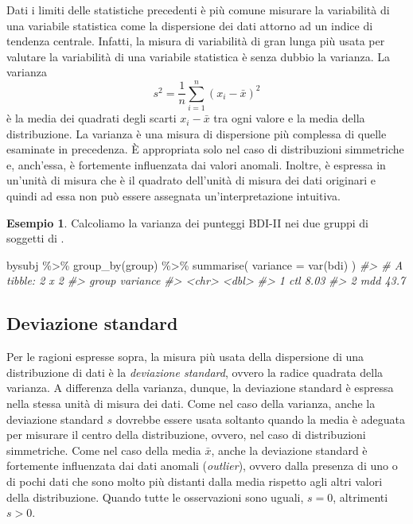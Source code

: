 \documentclass[
  11pt,
  italian,
  a4paper,
  extrafontsizes,onecolumn,openright
  ]{memoir}
\newenvironment{Shaded}{\begin{snugshade}}{\end{snugshade}}
\newcommand{\AttributeTok}[1]{\textcolor[rgb]{0.77,0.63,0.00}{#1}}
\newcommand{\CommentTok}[1]{\textcolor[rgb]{0.56,0.35,0.01}{\textit{#1}}}
\newcommand{\FunctionTok}[1]{\textcolor[rgb]{0.00,0.00,0.00}{#1}}
\newcommand{\NormalTok}[1]{#1}
\newcommand{\SpecialCharTok}[1]{\textcolor[rgb]{0.00,0.00,0.00}{#1}}
\theoremstyle{definition}
\theoremstyle{definition}
\newtheorem{example}{Esempio}[chapter]
\theoremstyle{definition}
\theoremstyle{definition}
\theoremstyle{remark}
\begin{document}
Dati i limiti delle statistiche precedenti è più comune misurare la
variabilità di una variabile statistica come la dispersione dei dati
attorno ad un indice di tendenza centrale. Infatti, la misura di variabilità di gran lunga più usata per valutare la variabilità di una variabile statistica è senza dubbio la varianza. La varianza
\begin{equation}
s^2 = \frac{1}{n} \sum_{i=1}^n (x_i - \bar{x})^2
\label{eq:var-descr}
\end{equation}
è la media dei quadrati degli scarti \(x_i - \bar{x}\) tra ogni valore e la media della distribuzione.
La varianza è una misura di dispersione più complessa di quelle esaminate in precedenza. È appropriata solo nel caso di distribuzioni simmetriche e, anch'essa, è fortemente influenzata dai valori anomali. Inoltre, è espressa in un'unità di misura che è il quadrato dell'unità di misura dei dati originari e quindi ad essa non può essere assegnata un'interpretazione intuitiva.

\begin{example}

Calcoliamo la varianza dei punteggi BDI-II nei due gruppi di soggetti di \textcite{zetschefuture2019}.

\begin{Shaded}
\begin{Highlighting}[]
\NormalTok{bysubj }\SpecialCharTok{\%\textgreater{}\%} 
  \FunctionTok{group\_by}\NormalTok{(group) }\SpecialCharTok{\%\textgreater{}\%} 
  \FunctionTok{summarise}\NormalTok{(}
    \AttributeTok{variance =} \FunctionTok{var}\NormalTok{(bdi)}
\NormalTok{  ) }
\CommentTok{\#\textgreater{} \# A tibble: 2 x 2}
\CommentTok{\#\textgreater{}   group variance}
\CommentTok{\#\textgreater{}   \textless{}chr\textgreater{}    \textless{}dbl\textgreater{}}
\CommentTok{\#\textgreater{} 1 ctl       8.03}
\CommentTok{\#\textgreater{} 2 mdd      43.7}
\end{Highlighting}
\end{Shaded}

\end{example}

\hypertarget{deviazione-standard}{%
\subsection{Deviazione standard}\label{deviazione-standard}}

Per le ragioni espresse sopra, la misura più usata della dispersione di una distribuzione di dati è la \emph{deviazione standard}, ovvero la radice quadrata della varianza. A differenza della varianza, dunque, la deviazione standard è espressa nella stessa unità di misura dei dati. Come nel caso della varianza, anche la deviazione standard \(s\) dovrebbe essere usata soltanto quando la media è adeguata per misurare il centro della distribuzione, ovvero, nel caso di distribuzioni simmetriche. Come nel caso della media \(\bar{x}\), anche la deviazione standard è fortemente influenzata dai dati anomali (\emph{outlier}), ovvero dalla presenza di uno o di pochi dati che sono molto più distanti dalla media rispetto agli altri valori della distribuzione. Quando tutte le osservazioni sono uguali, \(s=0\), altrimenti \(s > 0\).
\end{document}
